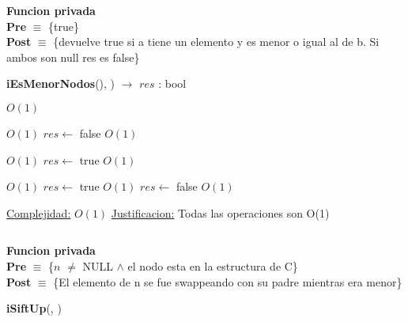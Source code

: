 \begin{Algoritmos}
$ $\newline


\textbf{Funcion privada}\\
\textbf{Pre} $\equiv$ \{true\}\\%
\textbf{Post} $\equiv$ \{devuelve true si a tiene un elemento y es menor o igual al de b. Si ambos son null res es false\}%
\begin{algorithm}[H]
{\textbf{iEsMenorNodos}(), ) $\to$ $res$ : bool}
\begin{algorithmic}[1]

     \Comment $O(1)$

          \Comment $O(1)$
            \State $res \gets$ false  \Comment $O(1)$
        \Else

              \Comment $O(1)$
                \State $res \gets$ true  \Comment $O(1)$
                
            \Else

                  \Comment $O(1)$
                    \State $res \gets$ true  \Comment $O(1)$
                \EndIf
            \EndIf
        \EndIf
    \Else
        \State $res \gets$ false  \Comment $O(1)$
    \EndIf


    \medskip
    \Statex \underline{Complejidad:} $O(1)$
    \Statex \underline{Justificacion:} Todas las operaciones son O(1)

\end{algorithmic}
\end{algorithm}



$ $\newline

\textbf{Funcion privada}\\
\textbf{Pre} $\equiv$ \{$n$ $\neq$ NULL $\land$ el nodo esta en la estructura de C\}\\%
\textbf{Post} $\equiv$ \{El elemento de n se fue swappeando con su padre mientras era menor\}%
\begin{algorithm}[H]
{\textbf{iSiftUp}(, )}
\begin{algorithmic}[1]


\end{algorithmic}
\end{algorithm}
\end{Algoritmos}
